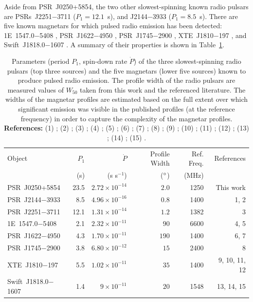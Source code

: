 Aside from PSR~J0250+5854, the two other slowest-spinning known radio pulsars are PSRs~J2251$-$3711 ($P_1=12.1$~s), and J2144$-$3933 ($P_1=8.5$~s). There are five known magnetars for which pulsed radio emission has been detected: 1E~1547.0$-$5408 \citep{CRHR2007a}, PSR~J1622$-$4950 \citep{LBB+2010}, PSR~J1745$-$2900 \citep{EFK+2013}, XTE~J1810$-$197 \citep{CRH+2006}, and Swift~J1818.0$-$1607 \citep{ERB+2020, LSJB2020}. A summary of their properties is shown in Table~\ref{tab: J0250 - magnetar comparison}.
\begin{table}
	\centering
	\caption[Properties of the slow rotation-powered pulsars and radio magnetars]{Parameters (period $P_1$, spin-down rate $\dot{P}$) of the three slowest-spinning radio pulsars (top three sources) and the five magnetars (lower five sources) known to produce pulsed radio emission. The profile width of the radio pulsars are measured values of $W_{50}$ taken from this work and the referenced literature. The widths of the magnetar profiles are estimated based on the full extent over which significant emission was visible in the published profiles (at the reference frequency) in order to capture the complexity of the magnetar profiles. \newline \textbf{References:} (1) \citet{YMJx1999}; (2) \citet{MBMA2020}; (3) \citet{MKE+2020}; (4) \citet{CRHR2007a}; (5) \citet{CRJ+2008}; (6) \citet{LBB+2010}; (7) \citet{LBB+2012}; (8) \citet{EFK+2013}; (9) \citet{CRH+2006}; (10) \citet{CRJ+2007b}; (11) \citet{KSJ+2007}; (12) \citet{LLD+2019}; (13) \citet{ERB+2020}; (14) \citet{LSJB2020}; (15) \citet{CCC+2020}.}
	\label{tab: J0250 - magnetar comparison}
	\begin{tabular}{lrrrrr} %
		\hline
	    Object & $P_1$  & $\dot{P}$   & Profile Width & Ref. Freq.  & References\\
	           &  (s) & (s s$^{-1}$) & ($^\circ$)     &       (MHz) &           \\        
		\hline
		PSR~J0250+5854          & 23.5 & $2.72\times10^{-14}$ &  $2.0$ & 1250 & This work\\
		PSR~J2144$-$3933        & 8.5  & $4.96\times10^{-16}$ &  $0.8$ & 1400 & 1, 2\\
		PSR~J2251$-$3711        & 12.1 & $1.31\times10^{-14}$ & $1.2$  & 1382 & 3\\
		\hline
		1E~1547.0$-$5408        & 2.1  & $2.32\times10^{-11}$ & $90$   & 6600 & 4, 5\\
        PSR~J1622$-$4950        & 4.3  & $1.70\times10^{-11}$ & $190$  & 1400 & 6, 7\\
        PSR~J1745$-$2900        & 3.8  & $6.80\times10^{-12}$ & $15$   & 2400 & 8\\
        XTE~J1810$-$197          & 5.5  & $1.02\times10^{-11}$ & $35$   & 1400 & 9, 10, 11, 12\\
        Swift~J1818.0$-$1607    & 1.4  & $9\times10^{-11}$    & $20$   & 1548 & 13, 14, 15\\
		\hline
	\end{tabular}
\end{table}

